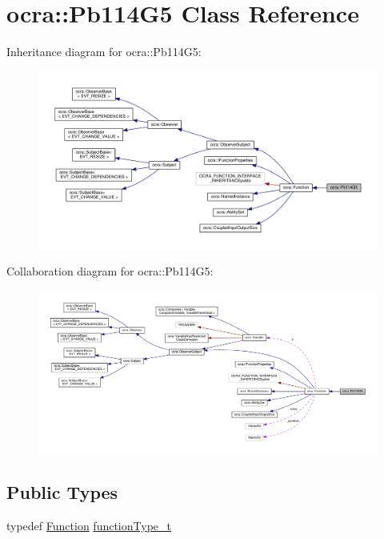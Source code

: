 \hypertarget{classocra_1_1Pb114G5}{}\section{ocra\+:\+:Pb114\+G5 Class Reference}
\label{classocra_1_1Pb114G5}


Inheritance diagram for ocra\+:\+:Pb114\+G5\+:
\nopagebreak
\begin{figure}[H]
\begin{center}
\leavevmode
\includegraphics[width=350pt]{d1/d2e/classocra_1_1Pb114G5__inherit__graph}
\end{center}
\end{figure}


Collaboration diagram for ocra\+:\+:Pb114\+G5\+:
\nopagebreak
\begin{figure}[H]
\begin{center}
\leavevmode
\includegraphics[width=350pt]{d2/d08/classocra_1_1Pb114G5__coll__graph}
\end{center}
\end{figure}
\subsection*{Public Types}
\begin{DoxyCompactItemize}
\item 
typedef \hyperlink{classocra_1_1Function}{Function} \hyperlink{classocra_1_1Pb114G5_af9b5d124dfe6eefc49fe0603b948330e}{function\+Type\+\_\+t}
\end{DoxyCompactItemize}
